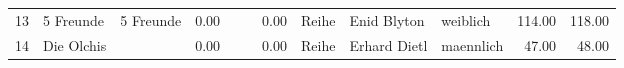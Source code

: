 \begin{table}
\begin{center}
{\begin{tabular}{rllrllrlllrr}
  13 & 5 Freunde                                                                                                                                                                                                                                                       & 5 Freunde                                                                                                                                                                                                                                                       & 0.00 &                                                                                                                                                                                                                                                                 &                                                                                                                                                                                                                                                                 & 0.00 & Reihe & Enid Blyton                                                                                                                                                                                                                                                     & weiblich & 114.00 & 118.00 \\ 
  14 & Die Olchis                                                                                                                                                                                                                                                      &                                                                                                                                                                                                                                                                 & 0.00 &                                                                                                                                                                                                                                                                 &                                                                                                                                                                                                                                                                 & 0.00 & Reihe & Erhard Dietl                                                                                                                                                                                                                                                    & maennlich & 47.00 & 48.00 \\ 

\end{tabular}}
\end{center}
\end{table}
